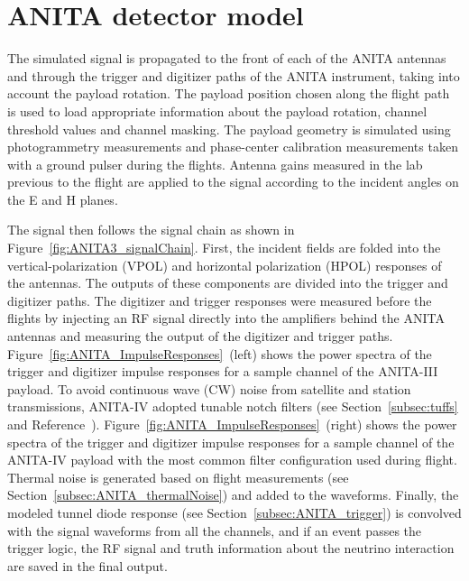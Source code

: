 \section{ANITA detector model}
\label{sec:ANITA}
The simulated signal is
propagated to the front of each of the ANITA antennas and through the
trigger and digitizer paths of the ANITA instrument, taking into
account the payload rotation.
The payload position chosen along the flight path is used to load appropriate information about the payload rotation, channel threshold values and channel masking.
The payload geometry is simulated using photogrammetry measurements
and phase-center calibration measurements taken with a ground pulser
during the flights.
Antenna gains measured in the lab previous to the flight are
applied to the signal according to the incident angles on the E and H planes. 

The signal then follows the signal chain as shown in
Figure~\ref{fig:ANITA3_signalChain}.
First, the incident fields are folded into the vertical-polarization (VPOL) and horizontal polarization (HPOL) responses of the antennas. 
The outputs of these components are divided into the trigger and digitizer paths.
The digitizer and trigger responses were measured before the flights
by injecting an RF signal directly into the amplifiers behind the
ANITA antennas and measuring the output of the digitizer and trigger paths. 
Figure~\ref{fig:ANITA_ImpulseResponses}~(left) shows the
power spectra of the trigger and digitizer impulse responses for a
sample channel of the ANITA-III payload.
To avoid continuous wave (CW) noise from satellite and station transmissions, ANITA-IV adopted 
tunable notch filters (see Section~\ref{subsec:tuffs} and Reference~\cite{Allison:2017vtk}).
Figure~\ref{fig:ANITA_ImpulseResponses}~(right) shows the
power spectra of the trigger and digitizer impulse responses for a
sample channel of the ANITA-IV payload with the most common filter configuration used during flight.
Thermal noise is generated based on flight measurements (see Section~\ref{subsec:ANITA_thermalNoise}) and added to the waveforms.
Finally, the modeled tunnel diode response (see
Section~\ref{subsec:ANITA_trigger}) is convolved with the signal
waveforms from all the channels, and if an event passes the trigger
logic, the RF signal and truth information about the neutrino
interaction are saved in the final output.

